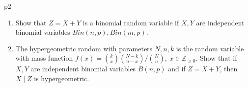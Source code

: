 \documentclass[a4paper, 11pt]{article}
\begin{document}

\begin{problem}{%
}{p2%
}
\begin{enumerate}[label=(\alph*)]
	\item Show that $Z=X+Y$ is a binomial random variable if $X, Y$ are independent binomial variables $Bin(n, p), Bin(m, p)$.
	\item The hypergeometric random with parameters $N, n, k$ is the random variable with mass function $f(x)={\binom{k}{x}\binom{N-k}{n-x}/\binom{N}{n}},\ x \in \mathbb{Z}_{\geq 0}$. Show that if $X, Y$ are independent binomial variables $B(n, p)$ and if $Z=X+Y$, then $X \mid Z$ is hypergeometric.
\end{enumerate}
\end{problem}
\end{document}
